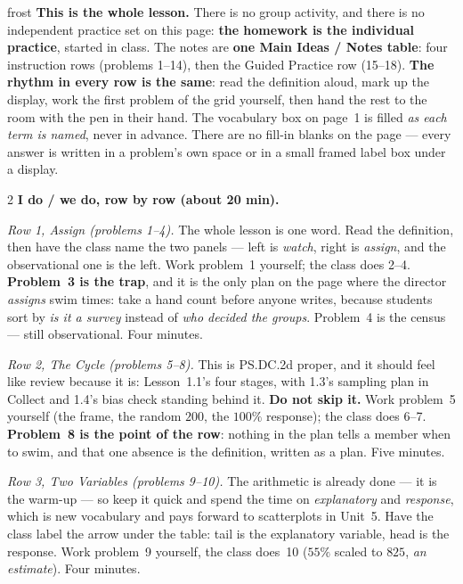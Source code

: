 \documentclass[10pt]{article}
\begin{document}
\boxguard
\begin{skillbox}{frost}
\textbf{This is the whole lesson.} There is no group activity, and there is no independent
practice set on this page: \textbf{the homework is the individual practice}, started in class.
The notes are \textbf{one Main Ideas / Notes table}: four instruction rows (problems 1--14),
then the Guided Practice row (15--18). \textbf{The rhythm in every row is the same}: read the
definition aloud, mark up the display, work the first problem of the grid yourself, then hand
the rest to the room with the pen in their hand. The vocabulary box on page~1 is filled
\emph{as each term is named}, never in advance. There are no fill-in blanks on the page --- every
answer is written in a problem's own space or in a small framed label box under a display.
\begin{multicols}{2}
\textbf{I do / we do, row by row (about 20 min).}

\emph{Row 1, Assign (problems 1--4).} The whole lesson is one word. Read the definition, then
have the class name the two panels --- left is \emph{watch}, right is \emph{assign}, and the
observational one is the left. Work problem~1 yourself; the class does 2--4. \textbf{Problem~3
is the trap}, and it is the only plan on the page where the director \emph{assigns} swim times:
take a hand count before anyone writes, because students sort by \emph{is it a survey} instead
of \emph{who decided the groups}. Problem~4 is the census --- still observational. Four minutes.

\emph{Row 2, The Cycle (problems 5--8).} This is PS.DC.2d proper, and it should feel like
review because it is: Lesson~1.1's four stages, with 1.3's sampling plan in Collect and 1.4's
bias check standing behind it. \textbf{Do not skip it.} Work problem~5 yourself (the frame, the
random $200$, the $100\%$ response); the class does 6--7. \textbf{Problem~8 is the point of the
row}: nothing in the plan tells a member when to swim, and that one absence is the definition,
written as a plan. Five minutes.

\emph{Row 3, Two Variables (problems 9--10).} The arithmetic is already done --- it is the
warm-up --- so keep it quick and spend the time on \emph{explanatory} and \emph{response},
which is new vocabulary and pays forward to scatterplots in Unit~5. Have the class label the
arrow under the table: tail is the explanatory variable, head is the response. Work problem~9
yourself, the class does~10 ($55\%$ scaled to $825$, \emph{an estimate}). Four minutes.


\end{multicols}
\end{skillbox}
\end{document}
